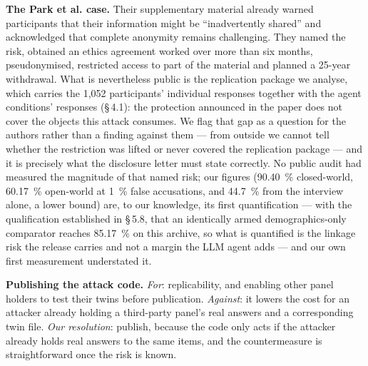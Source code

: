 \documentclass[sigconf,anonymous,review]{acmart}
\begin{document}
\begin{ethics}
\textbf{The Park et al. case.} Their supplementary material already warned participants that their information might be ``inadvertently shared'' and acknowledged that complete anonymity remains challenging. They named the risk, obtained an ethics agreement worked over more than six months, pseudonymised, restricted access to part of the material and planned a 25-year withdrawal. What is nevertheless public is the replication package we analyse, which carries the 1,052 participants' individual responses together with the agent conditions' responses (\S\,4.1): the protection announced in the paper does not cover the objects this attack consumes. We flag that gap as a question for the authors rather than a finding against them --- from outside we cannot tell whether the restriction was lifted or never covered the replication package --- and it is precisely what the disclosure letter must state correctly. No public audit had measured the magnitude of that named risk; our figures (90.40~\% closed-world, 60.17~\% open-world at 1~\% false accusations, and 44.7~\% from the interview alone, a lower bound) are, to our knowledge, its first quantification --- with the qualification established in \S\,5.8, that an identically armed demographics-only comparator reaches 85.17~\% on this archive, so what is quantified is the linkage risk the release carries and not a margin the LLM agent adds --- and our own first measurement understated it.

\textbf{Publishing the attack code.} \textit{For}: replicability, and enabling other panel holders to test their twins before publication. \textit{Against}: it lowers the cost for an attacker already holding a third-party panel's real answers and a corresponding twin file. \textit{Our resolution}: publish, because the code only acts if the attacker already holds real answers to the same items, and the countermeasure is straightforward once the risk is known.


\end{ethics}
\end{document}
